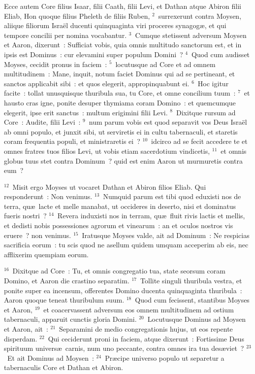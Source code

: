 \lettrine[lines=3,image=true,loversize=0.05,lraise=-0.03]{E}{}cce autem Core filius Isaar, filii Caath, filii Levi, et Dathan atque Abiron filii Eliab, Hon quoque filius Pheleth de filiis Ruben,
${}^{2}$~surrexerunt contra Moysen, aliique filiorum Isra\"el ducenti quinquaginta viri proceres synagog\ae , et qui tempore concilii per nomina vocabantur.
${}^{3}$~Cumque stetissent adversum Moysen et Aaron, dixerunt~: Sufficiat vobis, quia omnis multitudo sanctorum est, et in ipsis est Dominus~: cur elevamini super populum Domini~?
${}^{4}$~Quod cum audisset Moyses, cecidit pronus in faciem~:
${}^{5}$~locutusque ad Core et ad omnem multitudinem~: Mane, inquit, notum faciet Dominus qui ad se pertineant, et sanctos applicabit sibi~: et quos elegerit, appropinquabunt ei.
${}^{6}$~Hoc igitur facite~: tollat unusquisque thuribula sua, tu Core, et omne concilium tuum~:
${}^{7}$~et hausto cras igne, ponite desuper thymiama coram Domino~: et quemcumque elegerit, ipse erit sanctus~: multum erigimini filii Levi.
${}^{8}$~Dixitque rursum ad Core~: Audite, filii Levi~:
${}^{9}$~num parum vobis est quod separavit vos Deus Isra\"el ab omni populo, et junxit sibi, ut serviretis ei in cultu tabernaculi, et staretis coram frequentia populi, et ministraretis ei~?
${}^{10}$~idcirco ad se fecit accedere te et omnes fratres tuos filios Levi, ut vobis etiam sacerdotium vindicetis,
${}^{11}$~et omnis globus tuus stet contra Dominum~? quid est enim Aaron ut murmuretis contra eum~?


${}^{12}$~Misit ergo Moyses ut vocaret Dathan et Abiron filios Eliab. Qui responderunt~: Non venimus.
${}^{13}$~Numquid parum est tibi quod eduxisti nos de terra, qu\ae\ lacte et melle manabat, ut occideres in deserto, nisi et dominatus fueris nostri~?
${}^{14}$~Revera induxisti nos in terram, qu\ae\ fluit rivis lactis et mellis, et dedisti nobis possessiones agrorum et vinearum~: an et oculos nostros vis eruere~? non venimus.
${}^{15}$~Iratusque Moyses valde, ait ad Dominum~: Ne respicias sacrificia eorum~: tu scis quod ne asellum quidem umquam acceperim ab eis, nec afflixerim quempiam eorum.


${}^{16}$~Dixitque ad Core~: Tu, et omnis congregatio tua, state seorsum coram Domino, et Aaron die crastino separatim.
${}^{17}$~Tollite singuli thuribula vestra, et ponite super ea incensum, offerentes Domino ducenta quinquaginta thuribula~: Aaron quoque teneat thuribulum suum.
${}^{18}$~Quod cum fecissent, stantibus Moyses et Aaron,
${}^{19}$~et coacervassent adversum eos omnem multitudinem ad ostium tabernaculi, apparuit cunctis gloria Domini.
${}^{20}$~Locutusque Dominus ad Moysen et Aaron, ait~:
${}^{21}$~Separamini de medio congregationis hujus, ut eos repente disperdam.
${}^{22}$~Qui ceciderunt proni in faciem, atque dixerunt~: Fortissime Deus spirituum univers\ae\ carnis, num uno peccante, contra omnes ira tua des\ae viet~?
${}^{23}$~Et ait Dominus ad Moysen~:
${}^{24}$~Pr\ae cipe universo populo ut separetur a tabernaculis Core et Dathan et Abiron.


